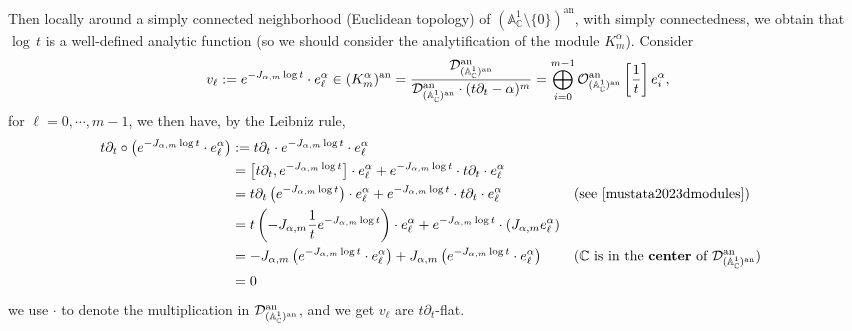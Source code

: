 Then locally around a simply connected neighborhood (Euclidean topology) of $(\mathbb{A}_{\mathbb{C}}^1 \setminus \{0\})^{\mathrm{an}}$,
with simply connectedness, we obtain that $\mathrm{\log}\, t$ is a well-defined analytic function (so we should consider the analytification of the module $K^\alpha_m$).
Consider
$$
    v_{\ell} := e^{-J_{\alpha,m} \log t} \cdot e_{\ell}^{\alpha} \in (K^\alpha_m)^{\mathrm{an}}
    = \frac{\mathcal{D}^{\mathrm{an}}_{(\mathbb{A}^1_{\mathbb{C}})^\mathrm{an}}}{\mathcal{D}^{\mathrm{an}}_{(\mathbb{A}^1_{\mathbb{C}})^\mathrm{an}}\cdot(t\partial_t - \alpha)^m}
    = \bigoplus_{i=0}^{m-1} \mathcal{O}^{\mathrm{an}}_{(\mathbb{A}^1_{\mathbb{C}})^\mathrm{an}}\left[\frac{1}{t}\right] e^\alpha_i,
$$
for $\ell = 0, \cdots, m-1$,
we then have, by the Leibniz rule,
\begin{align*}
    t\partial_t \circ \left(e^{-J_{\alpha,m} \log t} \cdot e_{\ell}^{\alpha}\right)
     & := t\partial_t \cdot e^{-J_{\alpha,m} \log t} \cdot e_{\ell}^{\alpha}                                                                                                                                                                                             \\
     & = \left[t\partial_t, e^{-J_{\alpha,m} \log t}\right] \cdot e_{\ell}^{\alpha} + e^{-J_{\alpha,m} \log t} \cdot t\partial_t \cdot e_{\ell}^{\alpha}                                                                                                                 \\
     & = t\partial_t\left(e^{-J_{\alpha,m} \log t}\right) \cdot e_{\ell}^{\alpha} + e^{-J_{\alpha,m} \log t} \cdot t\partial_t \cdot e_{\ell}^{\alpha}                              &  & \text{(see \cite[Prop~2.25(iii)]{mustata2023dmodules})}                         \\
     & = t \left( -J_{\alpha,m} \frac{1}{t} e^{-J_{\alpha,m} \log t} \right) \cdot e_{\ell}^{\alpha} + e^{-J_{\alpha,m} \log t} \cdot \left( J_{\alpha,m} e_{\ell}^{\alpha} \right)                                                                                      \\
     & = -J_{\alpha,m} \left( e^{-J_{\alpha,m} \log t} \cdot e_{\ell}^{\alpha} \right) + J_{\alpha,m} \left( e^{-J_{\alpha,m} \log t} \cdot e_{\ell}^{\alpha} \right)               &  & \text{($\C$ is in the \textbf{center} of $\D^{\an}_{(\mathbb{A}^1_\C)^{\an}}$)} \\
     & = 0
\end{align*}
we use $\cdot$ to denote the multiplication in $\mathcal{D}^{\mathrm{an}}_{(\mathbb{A}^1_{\mathbb{C}})^{\mathrm{an}}}$, and we get $v_{\ell}$ are $t\partial_t$-flat.

